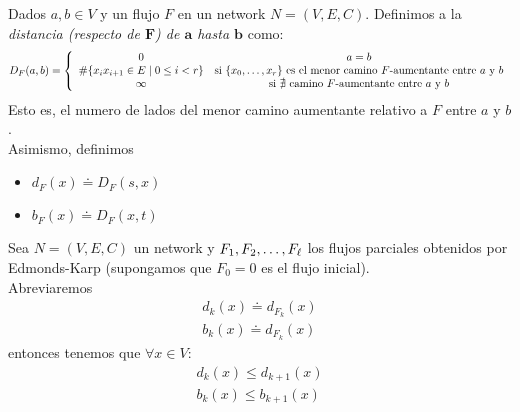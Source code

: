 \begin{definition}
  Dados $a,b\in V$ y un flujo $F$ en un network $N = (V,E,C)$. Definimos a la \emph{distancia (respecto de $\boldsymbol{F}$) de $\boldsymbol{a}$ hasta $\boldsymbol{b}$} como:
  \begin{align}
    D_F(a,b) = \left\{
    \begin{array}{cc}
      0 & a = b\\
      \#\{x_i x_{i+1} \in E\mid 0\le i < r \}  &\text{si $\{x_0, \mathellipsis, x_r\}$ es el menor camino $F$-aumentante entre $a$ y $b$} \\ 
      \infty &\text{si $\nexists$ camino $F$-aumentante entre $a$ y $b$}
    \end{array}
    \right.
  \end{align}
  Esto es, el numero de lados del menor camino aumentante relativo a $F$ entre $a$ y $b$.\\
  Asimismo, definimos
  \begin{itemize}
  \item $d_F(x) \doteq D_F(s,x)$
  \item $b_F(x) \doteq D_F(x,t)$
  \end{itemize}
\end{definition}

\begin{lemma}\label{distancias_no_decrecen_EK}
  Sea $N=(V,E,C)$ un network y $F_1, F_2, \mathellipsis, F_\ell$ los flujos parciales obtenidos por Edmonds-Karp (supongamos que $F_0 = 0$ es el flujo inicial).\\
  Abreviaremos
  \begin{align}
    d_k(x) \doteq d_{F_k}(x) \\
    b_k(x) \doteq d_{F_k}(x)
  \end{align} entonces tenemos que $\forall x \in V$:
  \begin{align}
    d_k(x) \le d_{k+1}(x) \\
    b_k(x) \le b_{k+1}(x)
  \end{align}
\end{lemma}

